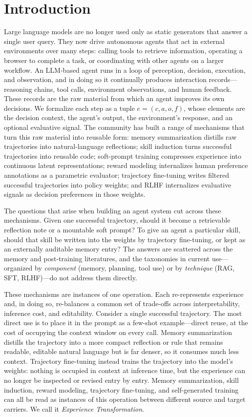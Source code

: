 \section{Introduction}
\label{sec:intro}

Large language models are no longer used only as static generators that answer a single user query. They now drive autonomous agents that act in external environments over many steps: calling tools to retrieve information, operating a browser to complete a task, or coordinating with other agents on a larger workflow. An LLM-based agent runs in a loop of perception, decision, execution, and observation, and in doing so it continually produces interaction records---reasoning chains, tool calls, environment observations, and human feedback. These records are the raw material from which an agent improves its own decisions. We formalize each step as a tuple $e = (c, a, o, f)$, whose elements are the decision context, the agent's output, the environment's response, and an optional evaluative signal. The community has built a range of mechanisms that turn this raw material into reusable form: memory summarization distills raw trajectories into natural-language reflections; skill induction turns successful trajectories into reusable code; soft-prompt training compresses experience into continuous latent representations; reward modeling internalizes human preference annotations as a parametric evaluator; trajectory fine-tuning writes filtered successful trajectories into policy weights; and RLHF internalizes evaluative signals as decision preferences in those weights.

The questions that arise when building an agent system cut across these mechanisms. Given one successful trajectory, should it become a retrievable reflection note or a mountable soft prompt? To give an agent a particular skill, should that skill be written into the weights by trajectory fine-tuning, or kept as an externally auditable memory entry? The answers are scattered across the memory and post-training literatures, and the taxonomies in current use---organized by \emph{component} (memory, planning, tool use) or by \emph{technique} (RAG, SFT, RLHF)---do not address them directly.

These mechanisms are instances of one operation. Each re-represents experience and, in doing so, re-balances a common set of trade-offs across interpretability, inference cost, and editability. Consider a single successful trajectory. The most direct use is to place it in the prompt as a few-shot example---direct reuse, at the cost of occupying the context window on every call. Memory summarization distills the trajectory into a more compact reflection or rule that remains readable, editable natural language but is far denser, so it consumes much less context. Trajectory fine-tuning instead trains the trajectory into the model's weights: nothing is occupied in context at inference time, but the experience can no longer be inspected or revised entry by entry. Memory summarization, skill induction, reward modeling, trajectory fine-tuning, and self-generated training can all be read as instances of this operation between different source and target carriers. We call it \emph{Experience Transformation}.

